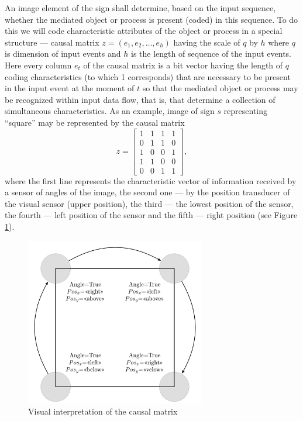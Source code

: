 \documentclass[review]{elsarticle}
\begin{document}
An image element of the sign shall determine, based on the input sequence,  whether the mediated object or process is present (coded) in this sequence. To do this we will code characteristic attributes of the object or process in a special structure --- causal matrix $z=(e_1,e_2,\dots,e_h)$ having the scale of $q$ by $h$ where $q$ is dimension of input events and $h$ is the length of sequence of the input events. Here every column $e_t$ of the causal matrix is a bit vector having the length of $q$ coding characteristics (to which 1 corresponds) that are necessary to be present in the input event at the moment of $t$ so that the mediated object or process may be recognized within input data flow, that is, that determine a collection of simultaneous characteristics. As an example, image of sign $s$ representing ``square'' may be represented by the causal matrix 
\[
	z=\begin{bmatrix}
	1&1&1&1\\
	0&1&1&0\\
	1&0&0&1\\
	1&1&0&0\\
	0&0&1&1
	\end{bmatrix},
\]
where the first line represents the characteristic vector of information received by a sensor of angles of the image, the second one --- by the position transducer of the visual sensor (upper position), the third --- the lowest position of the sensor, the fourth --- left position of the sensor and the fifth --- right position (see Figure \ref{fig:square}).

\begin{figure}
	\label{fig:square}
	\centering
	\includegraphics[width=0.7\textwidth]{square_en}
	\caption{Visual interpretation of the causal matrix}		
\end{figure}
\end{document}
